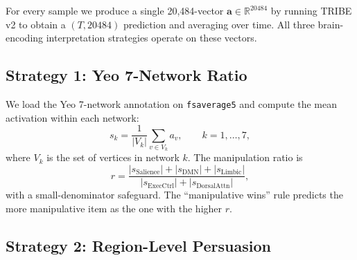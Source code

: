 \documentclass[11pt]{article}
\begin{document}
For every sample we produce a single 20{,}484-vector $\mathbf{a} \in \mathbb{R}^{20484}$ by running TRIBE v2 to obtain a $(T, 20484)$ prediction and averaging over time. All three brain-encoding interpretation strategies operate on these vectors.

\subsection{Strategy 1: Yeo 7-Network Ratio}

We load the Yeo 7-network annotation on \texttt{fsaverage5} and compute the mean activation within each network:
\begin{equation}
    s_k = \frac{1}{|V_k|} \sum_{v \in V_k} a_v, \qquad k = 1, \ldots, 7,
\end{equation}
where $V_k$ is the set of vertices in network $k$. The manipulation ratio is
\begin{equation}
    r = \frac{|s_{\text{Salience}}| + |s_{\text{DMN}}| + |s_{\text{Limbic}}|}{|s_{\text{ExecCtrl}}| + |s_{\text{DorsalAttn}}|},
\end{equation}
with a small-denominator safeguard. The ``manipulative wins'' rule predicts the more manipulative item as the one with the higher $r$.

\subsection{Strategy 2: Region-Level Persuasion}
\end{document}
